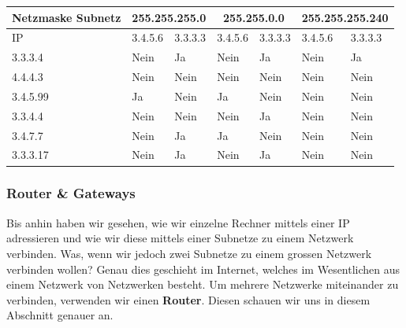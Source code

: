\begin{myexercise}
\begin{center}
	\end{center}
	\begin{myanswer}
		\begin{table}[H]
			\centering
			\begin{tabular}{m{1.5cm}||m{1.5cm}|m{1.5cm}|m{1.5cm}|m{1.5cm}|m{1.5cm}|m{1.7cm}}
				\textbf{Netzmaske Subnetz} & \multicolumn{2}{c|}{255.255.255.0} & \multicolumn{2}{c|}{255.255.0.0} & \multicolumn{2}{c}{255.255.255.240}                               \\
				\midrule
				IP                         & 3.4.5.6                            & 3.3.3.3                          & 3.4.5.6                             & 3.3.3.3 & 3.4.5.6 & 3.3.3.3 \\
				\midrule\midrule
				3.3.3.4                    & Nein                               & Ja                               & Nein                                & Ja      & Nein    & Ja      \\\midrule
				4.4.4.3                    & Nein                               & Nein                             & Nein                                & Nein    & Nein    & Nein    \\\midrule
				3.4.5.99                   & Ja                                 & Nein                             & Ja                                  & Nein    & Nein    & Nein    \\\midrule
				3.3.4.4                    & Nein                               & Nein                             & Nein                                & Ja      & Nein    & Nein    \\\midrule
				3.4.7.7                    & Nein                               & Ja                               & Ja                                  & Nein    & Nein    & Nein    \\\midrule
				3.3.3.17                   & Nein                               & Ja                               & Nein                                & Ja      & Nein    & Nein    \\
			\end{tabular}
		\end{table}
	\end{myanswer}
\end{myexercise}

\subsubsection{Router \& Gateways}

Bis anhin haben wir gesehen, wie wir einzelne Rechner mittels einer IP adressieren und wie wir diese mittels einer Subnetze zu einem Netzwerk verbinden. Was, wenn wir jedoch zwei Subnetze zu einem grossen Netzwerk verbinden wollen? Genau dies geschieht im Internet, welches im Wesentlichen aus einem Netzwerk von Netzwerken besteht. Um mehrere Netzwerke miteinander zu verbinden, verwenden wir einen \textbf{Router}. Diesen schauen wir uns in diesem Abschnitt genauer an.

